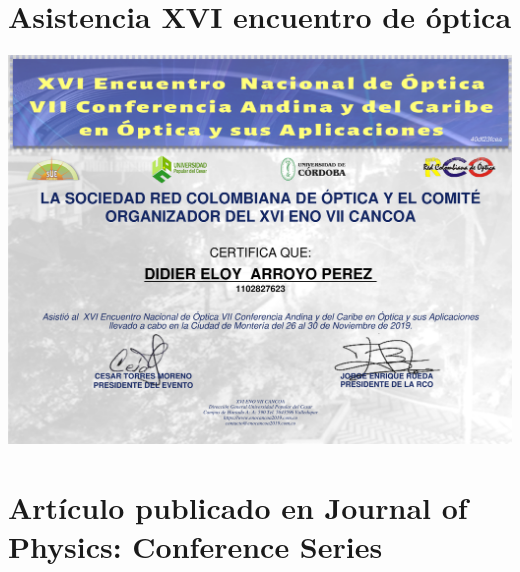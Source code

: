 \renewcommand{\appendixname}{Anexos}
\renewcommand{\appendixtocname}{Anexos}
\renewcommand{\appendixpagename}{Anexos}
\appendix
\clearpage
\addappheadtotoc
\appendixpage

\chapter{Asistencia XVI encuentro de óptica }
%

\newpage
\includegraphics[scale=0.5]{ANEXOS/asistencia.pdf}

\chapter{Artículo publicado en Journal of Physics: Conference Series }
%

